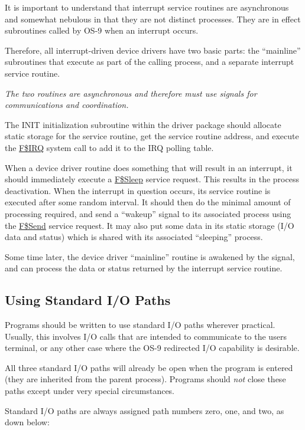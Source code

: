 \documentclass[
]{article}
\begin{document}
It is important to understand that interrupt service routines are
asynchronous and somewhat nebulous in that they are not distinct
processes. They are in effect subroutines called by OS-9 when an
interrupt occurs.

Therefore, all interrupt-driven device drivers have two basic parts: the
``mainline'' subroutines that execute as part of the calling process,
and a separate interrupt service routine.

\emph{The two routines are asynchronous and therefore must use signals
for communications and coordination.}

The INIT initialization subroutine within the driver package should
allocate static storage for the service routine, get the service routine
address, and execute the \hyperref[f.irq]{F\$IRQ} system call to add it
to the IRQ polling table.

When a device driver routine does something that will result in an
interrupt, it should immediately execute a \hyperref[f.sleep]{F\$Sleep}
service request. This results in the process\textquotesingle{}
deactivation. When the interrupt in question occurs, its service routine
is executed after some random interval. It should then do the minimal
amount of processing required, and send a ``wakeup'' signal to its
associated process using the \hyperref[f.send]{F\$Send} service request.
It may also put some data in its static storage (I/O data and status)
which is shared with its associated ``sleeping'' process.

Some time later, the device driver ``mainline'' routine is awakened by
the signal, and can process the data or status returned by the interrupt
service routine.

\subsection{Using Standard I/O Paths}

Programs should be written to use standard I/O paths wherever practical.
Usually, this involves I/O calls that are intended to communicate to the
user\textquotesingle s terminal, or any other case where the OS-9
redirected I/O capability is desirable.

All three standard I/O paths will already be open when the program is
entered (they are inherited from the parent process). Programs should
\emph{not} close these paths except under very special circumstances.

Standard I/O paths are always assigned path numbers zero, one, and two,
as down below:
\end{document}
